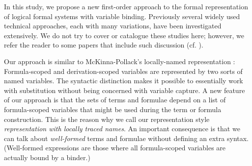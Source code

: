 \documentclass{svjour3}                     %
\begin{document}


In this study, we propose a new first-order approach to the formal representation of logical formal systems with variable binding. Previously several widely used technical approaches, each with many variations, have been investigated extensively. We do not try to cover or catalogue these studies here; however, we refer the reader to some papers that  include such discussion (cf. \cite{AmCrMo,engineering,deBruijn,GordonMelham,HarperLicata,mcpol99,nominalT}).

Our approach is similar to McKinna-Pollack's locally-named representation \cite{mcpol93,mcpol99}: Formula-scoped and derivation-scoped variables are represented by two sorts of named variables. The syntactic distinction makes it possible to essentially work with substitution without being concerned with variable capture. A new feature of our approach is that the sets of terms and formulae depend on a list of formula-scoped variables that might be used during the term or formula construction. This is the reason why we call our representation style \textit{representation with locally traced names}. An important consequence is that we can talk about \textit{well-formed} terms and formulae without defining an extra syntax. (Well-formed expressions are those where all formula-scoped variables are actually bound by a binder.) 
\end{document}
